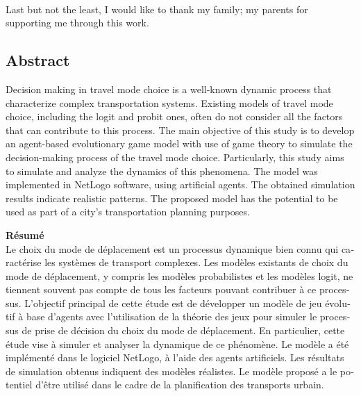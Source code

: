 \documentclass[12pt]{report}
\begin{document}
\paragraph{}
Last but not the least, I would like to thank my family; my parents for supporting me through this work. 
\clearpage
\begin{center}


\section*{Abstract}


Decision making in travel mode choice is a well-known dynamic process that characterize complex transportation systems. Existing models of travel mode choice, including the logit and probit ones, often do not consider all the factors that can contribute to this process. The main objective of this study is to develop an agent-based evolutionary game model with use of game theory to simulate the decision-making process of the travel mode choice. Particularly, this study aims to simulate and analyze the dynamics of this phenomena. The model was implemented in NetLogo software, using artificial agents. The obtained simulation results indicate realistic patterns. The proposed model has the potential to be used as part of a city's transportation planning purposes.
\\
\vspace{0.2cm}
   \begin{otherlanguage}{french}
   \textbf{Résumé}\\
   \vspace{0.2cm}
Le choix du mode de déplacement est un processus dynamique bien connu qui caractérise les systèmes de transport complexes. Les modèles existants de choix du mode de déplacement, y compris les modèles probabilistes et les modèles logit, ne tiennent souvent pas compte de tous les facteurs pouvant contribuer à ce processus. L'objectif principal de cette étude est de développer un modèle de jeu évolutif à base d'agents avec l'utilisation de la théorie des jeux pour simuler le processus de prise de décision du choix du mode de déplacement. En particulier, cette étude vise à simuler et analyser la dynamique de ce phénomène. Le modèle a été implémenté dans le logiciel NetLogo, à l'aide des agents artificiels. Les résultats de simulation obtenus indiquent des modèles réalistes. Le modèle proposé a le potentiel d'être utilisé dans le cadre de la planification des transports urbain.
\vspace{0.2cm}
\end{otherlanguage}
  \\
  

\end{center}
\end{document}
